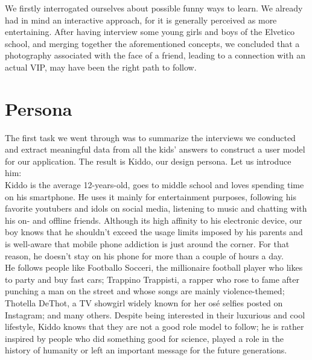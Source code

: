 \documentclass[12pt]{scrartcl}
\begin{document}
	We firstly interrogated ourselves about possible funny ways to learn.  We already had in mind an interactive approach, for it is generally perceived as more entertaining. After having interview some young girls and boys of the Elvetico school, and merging together the aforementioned concepts, we concluded that a photography associated with the face of a friend, leading to a connection with an actual VIP, may have been the right path to follow.\\


\section{Persona}

	
	The first task we went through was to summarize the interviews we conducted and extract meaningful data from all the kids' 
	answers to construct a user model for our application. The result is Kiddo, our design persona. Let us introduce him:\\
	
	Kiddo is the average 12-years-old, goes to middle school and loves spending time on his smartphone. He uses it mainly for 
	entertainment purposes, following his favorite youtubers and idols on social media, listening to music and chatting with his on- 
	and offline friends. Although its high affinity to his electronic device, our boy knows that he shouldn't exceed the usage limits 
	imposed by his parents and is well-aware that mobile phone addiction is just around the corner. For that reason, he doesn't
	stay on his phone for more than a couple of hours a day.\\
	
	He follows people like Footballo Socceri, the millionaire football player who likes to party and buy fast cars; 
	Trappino Trappisti, a rapper who rose to fame after punching a man on the street and whose songs are mainly violence-themed;
	Thotella DeThot, a TV showgirl widely known for her osé selfies posted on Instagram; and many others. Despite being interested 
	in their luxurious and cool lifestyle, Kiddo knows that they are not a good role model to follow; he is rather inspired by people
	who did something good for science, played a role in the history of humanity or left an important message for the future
	generations.\\
	
\end{document}
